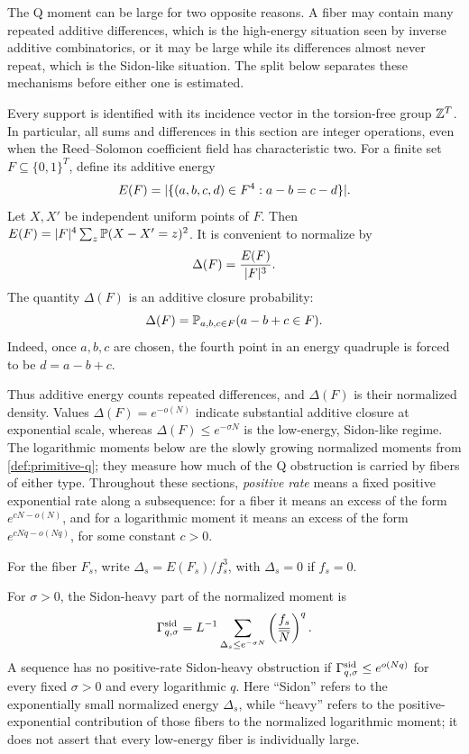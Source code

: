 \documentclass[11pt,a4paper]{amsart}
\numberwithin{equation}{section}
\theoremstyle{remark}
\begin{document}
The Q moment can be large for two opposite reasons.  A fiber may contain
many repeated additive differences, which is the high-energy situation
seen by inverse additive combinatorics, or it may be large while its
differences almost never repeat, which is the Sidon-like situation.  The
split below separates these mechanisms before either one is estimated.

Every support is identified with its incidence vector in the torsion-free
group \(\mathbb Z^T\).  In particular, all sums and differences in this section
are integer operations, even when the Reed--Solomon coefficient field has
characteristic two.  For a finite set \(F\subseteq\{0,1\}^T\), define its
additive energy
\[
        E(F)=\lvert \{(a,b,c,d)\in F^4:a-b=c-d\}\rvert.
\]
Let \(X,X'\) be independent uniform points of \(F\).  Then \(E(F)=\lvert F\rvert^4\sum_z\mathbb P(X-X'=z)^2\).  It is convenient to normalize by
\[
        \Delta(F)=\frac{E(F)}{\lvert F\rvert^3}.
\]
The quantity \(\Delta(F)\) is an additive closure probability:
\[
        \Delta(F)=\mathbb P_{a,b,c\in F}(a-b+c\in F).
\]
Indeed, once \(a,b,c\) are chosen, the fourth point in an energy quadruple is forced to be \(d=a-b+c\).

Thus additive energy counts repeated differences, and \(\Delta(F)\) is
their normalized density.  Values \(\Delta(F)=e^{-o(N)}\) indicate
substantial additive closure at exponential scale, whereas
\(\Delta(F)\le e^{-\sigma N}\) is the low-energy, Sidon-like regime.
The logarithmic moments below are the slowly growing normalized moments
from \cref{def:primitive-q}; they measure how much of the Q obstruction is
carried by fibers of either type.
Throughout these sections, \emph{positive rate} means a fixed positive
exponential rate along a subsequence: for a fiber it means an excess of
the form \(e^{cN-o(N)}\), and for a logarithmic moment it means an excess
of the form \(e^{cNq-o(Nq)}\), for some constant \(c>0\).

For the fiber \(F_s\), write \(\Delta_s=E(F_s)/f_s^3\), with \(\Delta_s=0\) if \(f_s=0\).

\begin{definition}\label{def:sidon-heavy}
For \(\sigma>0\), the Sidon-heavy part of the normalized moment is
\[
        \Gamma^{\rm sid}_{q,\sigma}=L^{-1}\sum_{\Delta_s\le e^{-\sigma N}}
        \left(\frac{f_s}{\overline N}\right)^q.
\]
A sequence has no positive-rate Sidon-heavy obstruction if \(\Gamma^{\rm sid}_{q,\sigma}\le e^{o(Nq)}\) for every fixed \(\sigma>0\) and every logarithmic \(q\).
Here ``Sidon'' refers to the exponentially small normalized energy
\(\Delta_s\), while ``heavy'' refers to the positive-exponential
contribution of those fibers to the normalized logarithmic moment; it does
not assert that every low-energy fiber is individually large.
\end{definition}
\end{document}

